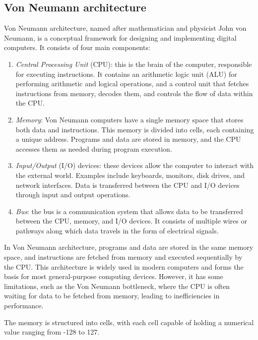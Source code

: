 \subsection{Von Neumann architecture}
Von Neumann architecture, named after mathematician and physicist John von Neumann, is a conceptual framework for designing and implementing digital computers. 
It consists of four main components:
\begin{enumerate}
    \item \textit{Central Processing Unit} (CPU): this is the brain of the computer, responsible for executing instructions. 
        It contains an arithmetic logic unit (ALU) for performing arithmetic and logical operations, and a control unit that fetches instructions from memory, decodes them, and controls the flow of data within the CPU.
    \item \textit{Memory}: Von Neumann computers have a single memory space that stores both data and instructions. 
        This memory is divided into cells, each containing a unique address. 
        Programs and data are stored in memory, and the CPU accesses them as needed during program execution.
    \item \textit{Input/Output} (I/O) devices: these devices allow the computer to interact with the external world. 
        Examples include keyboards, monitors, disk drives, and network interfaces. 
        Data is transferred between the CPU and I/O devices through input and output operations.
    \item \textit{Bus}: the bus is a communication system that allows data to be transferred between the CPU, memory, and I/O devices. 
        It consists of multiple wires or pathways along which data travels in the form of electrical signals.
\end{enumerate}
In Von Neumann architecture, programs and data are stored in the same memory space, and instructions are fetched from memory and executed sequentially by the CPU. 
This architecture is widely used in modern computers and forms the basis for most general-purpose computing devices. 
However, it has some limitations, such as the Von Neumann bottleneck, where the CPU is often waiting for data to be fetched from memory, leading to inefficiencies in performance.

The memory is structured into cells, with each cell capable of holding a numerical value ranging from -128 to 127.